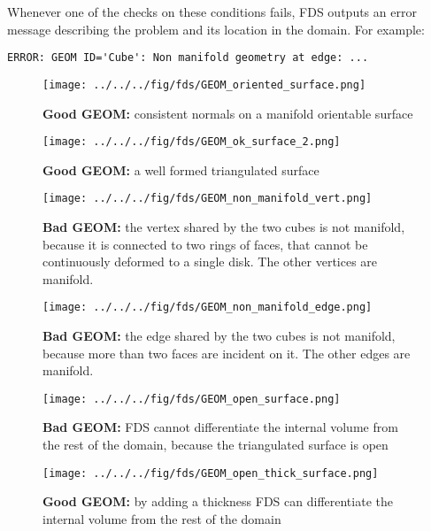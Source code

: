 \documentclass[12pt]{article}
\begin{document}
\pagebreak
Whenever one of the checks on these conditions fails, FDS outputs an error message describing the problem and its location in the domain. For example:\nopagebreak
\begin{verbatim}
ERROR: GEOM ID='Cube': Non manifold geometry at edge: ...
\end{verbatim}

\begin{figure}
	\centering
	\begin{minipage}{.45\textwidth}
		\centering
		\texttt{[image: ../../../fig/fds/GEOM\_oriented\_surface.png]}
		\caption{\textbf{Good {\ct GEOM}:} consistent normals on a manifold orientable surface}
		\label{figure:GEOM_oriented_surface}
	\end{minipage}%
	\hfill
	\begin{minipage}{.45\textwidth}
		\centering
		\texttt{[image: ../../../fig/fds/GEOM\_ok\_surface\_2.png]}
		\caption{\textbf{Good {\ct GEOM}:} a well formed triangulated surface}
		\label{figure:GEOM_ok_surface_2}	
	\end{minipage}%
\end{figure}

\begin{figure}
	\centering
	\begin{minipage}{.45\textwidth}
		\centering
		\texttt{[image: ../../../fig/fds/GEOM\_non\_manifold\_vert.png]}
		\caption{\textbf{Bad {\ct GEOM}:} the vertex shared by the two cubes is not manifold, because it is connected to two rings of faces, that cannot be continuously deformed to a single disk. The other vertices are manifold.}
		\label{figure:GEOM_non_manifold_vert}
	\end{minipage}%
	\hfill
	\begin{minipage}{.45\textwidth}
		\centering
		\texttt{[image: ../../../fig/fds/GEOM\_non\_manifold\_edge.png]}
		\caption{\textbf{Bad {\ct GEOM}:} the edge shared by the two cubes is not manifold, because more than two faces are incident on it. The other edges are manifold.\newline}
		\label{figure:GEOM_non_manifold_edge}
	\end{minipage}%
\end{figure}

\begin{figure}
	\centering
	\begin{minipage}{.45\textwidth}
		\centering
		\texttt{[image: ../../../fig/fds/GEOM\_open\_surface.png]}
		\caption{\textbf{Bad {\ct GEOM}:} FDS cannot differentiate the internal volume from the rest of the domain, because the triangulated surface is open}
		\label{figure:GEOM_open_surface}
	\end{minipage}%
	\hfill
	\begin{minipage}{.45\textwidth}
		\centering
		\texttt{[image: ../../../fig/fds/GEOM\_open\_thick\_surface.png]}
		\caption{\textbf{Good {\ct GEOM}:} by adding a thickness FDS can differentiate the internal volume from the rest of the domain\newline}
		\label{figure:GEOM_open_thick_surface}
\end{minipage}%
\end{figure}
\end{document}
